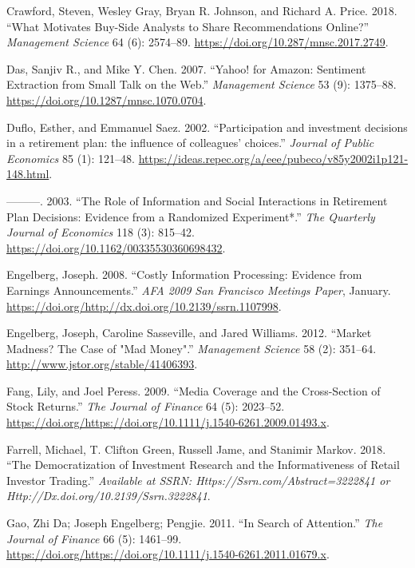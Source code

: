\documentclass[12pt,]{article}
\begin{document}
\leavevmode\hypertarget{ref-crawford2018}{}%
Crawford, Steven, Wesley Gray, Bryan R. Johnson, and Richard A. Price.
2018. ``What Motivates Buy-Side Analysts to Share Recommendations
Online?'' \emph{Management Science} 64 (6): 2574--89.
\url{https://doi.org/10.287/mnsc.2017.2749}.

\leavevmode\hypertarget{ref-das2007}{}%
Das, Sanjiv R., and Mike Y. Chen. 2007. ``Yahoo! for Amazon: Sentiment
Extraction from Small Talk on the Web.'' \emph{Management Science} 53
(9): 1375--88. \url{https://doi.org/10.1287/mnsc.1070.0704}.

\leavevmode\hypertarget{ref-duflo2002}{}%
Duflo, Esther, and Emmanuel Saez. 2002. ``Participation and investment
decisions in a retirement plan: the influence of colleagues' choices.''
\emph{Journal of Public Economics} 85 (1): 121--48.
\url{https://ideas.repec.org/a/eee/pubeco/v85y2002i1p121-148.html}.

\leavevmode\hypertarget{ref-duflo2003}{}%
---------. 2003. ``The Role of Information and Social Interactions in
Retirement Plan Decisions: Evidence from a Randomized Experiment*.''
\emph{The Quarterly Journal of Economics} 118 (3): 815--42.
\url{https://doi.org/10.1162/00335530360698432}.

\leavevmode\hypertarget{ref-engelberg2008}{}%
Engelberg, Joseph. 2008. ``Costly Information Processing: Evidence from
Earnings Announcements.'' \emph{AFA 2009 San Francisco Meetings Paper},
January.
\href{https://doi.org/http://dx.doi.org/10.2139/ssrn.1107998\%20}{https://doi.org/http://dx.doi.org/10.2139/ssrn.1107998}.

\leavevmode\hypertarget{ref-engelberg2012}{}%
Engelberg, Joseph, Caroline Sasseville, and Jared Williams. 2012.
``Market Madness? The Case of "Mad Money".'' \emph{Management Science}
58 (2): 351--64. \url{http://www.jstor.org/stable/41406393}.

\leavevmode\hypertarget{ref-fang2009}{}%
Fang, Lily, and Joel Peress. 2009. ``Media Coverage and the
Cross-Section of Stock Returns.'' \emph{The Journal of Finance} 64 (5):
2023--52.
\url{https://doi.org/https://doi.org/10.1111/j.1540-6261.2009.01493.x}.

\leavevmode\hypertarget{ref-farrell2018}{}%
Farrell, Michael, T. Clifton Green, Russell Jame, and Stanimir Markov.
2018. ``The Democratization of Investment Research and the
Informativeness of Retail Investor Trading.'' \emph{Available at SSRN:
Https://Ssrn.com/Abstract=3222841 or
Http://Dx.doi.org/10.2139/Ssrn.3222841}.

\leavevmode\hypertarget{ref-da2011}{}%
Gao, Zhi Da; Joseph Engelberg; Pengjie. 2011. ``In Search of
Attention.'' \emph{The Journal of Finance} 66 (5): 1461--99.
\url{https://doi.org/https://doi.org/10.1111/j.1540-6261.2011.01679.x}.
\end{document}
